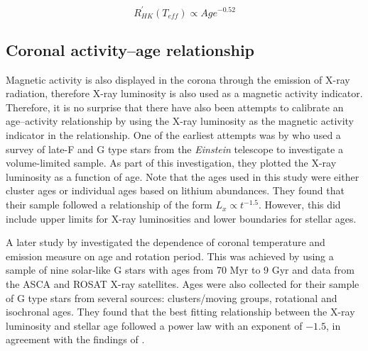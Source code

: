 \begin{equation}
    R^{'}_{HK}(T_{eff}) \propto Age^{-0.52}
    \label{Eq:LO_etal_18_law}
\end{equation}

\subsection{Coronal activity--age relationship}
\label{hist_xray_age_section}
Magnetic activity is also displayed in the corona through the emission of X-ray radiation, therefore X-ray luminosity is also used as a magnetic activity indicator. Therefore, it is no surprise that there have also been attempts to calibrate an age--activity relationship by using the X-ray luminosity as the magnetic activity indicator in the relationship. One of the earliest attempts was by \citet{Maggio_etal_1987} who used a survey of late-F and G type stars from the \textit{Einstein} telescope to investigate a volume-limited sample. As part of this investigation, they plotted the X-ray luminosity as a function of age. Note that the ages used in this study were either cluster ages or individual ages based on lithium abundances. They found that their sample followed a relationship of the form $L_{x} \propto t^{-1.5}$. However, this did include upper limits for X-ray luminosities and lower boundaries for stellar ages.

A later study by \citet{Gudel_etal_1997} investigated the dependence of coronal temperature and emission measure on age and rotation period. This was achieved by using a sample of nine solar-like G stars with ages from 70 Myr to 9 Gyr and data from the ASCA and ROSAT X-ray satellites. 
Ages were also collected for their sample of G type stars from several sources: clusters/moving groups, rotational and isochronal ages. They found that the best fitting relationship between the X-ray luminosity and stellar age followed a power law with an exponent of $-1.5$, in agreement with the findings of \citet{Maggio_etal_1987}.

